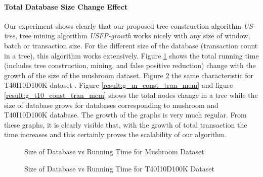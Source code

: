     \paragraph{Total Database Size Change Effect}Our experiment shows clearly that our proposed tree construction algorithm \emph{US-tree}, tree mining algorithm \emph{USFP-growth} works nicely with any size of window, batch or transaction size. For the different size of the database (transaction count in a tree), this algorithm works extensively. Figure \ref{result:g_m_const_tran} shows the total running time (includes tree construction, mining, and false positive reduction) change with the growth of the size of the mushroom dataset. Figure \ref{result:g_t10_const_tran} the same characteristic for T40I10D100K dataset . Figure \ref{result:g_m_const_tran_mem} and figure \ref{result:g_t10_const_tran_mem} shows the total nodes change in a tree while the size of database grows for databases corresponding to mushroom and T40I10D100K database. The growth of the graphs is very much regular. From these graphs, it is clearly visible that, with the growth of total transaction the time increases and this certainly proves the scalability of our algorithm. 
        \begin{figure}[h]
        \centering
            
        \caption{Size of Database vs Running Time for Mushroom Dataset }
        \label{result:g_m_const_tran}
        \end{figure}
        \begin{figure}[h]
        \centering
            
        \caption{Size of Database vs Running Time for T40I10D100K Dataset }
        \label{result:g_t10_const_tran}
        \end{figure}
%            
